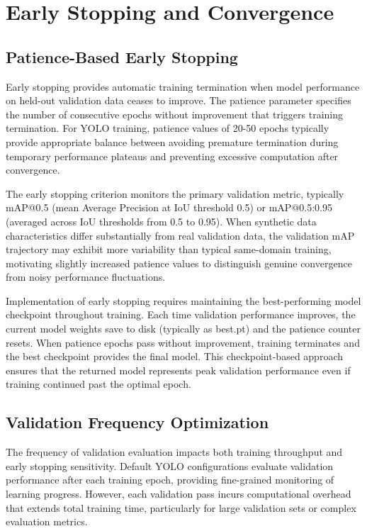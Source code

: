 \section{Early Stopping and Convergence}
\label{sec:early_stopping}

\subsection{Patience-Based Early Stopping}

Early stopping provides automatic training termination when model performance on held-out validation data ceases to improve. The patience parameter specifies the number of consecutive epochs without improvement that triggers training termination. For YOLO training, patience values of 20-50 epochs typically provide appropriate balance between avoiding premature termination during temporary performance plateaus and preventing excessive computation after convergence.

The early stopping criterion monitors the primary validation metric, typically mAP@0.5 (mean Average Precision at IoU threshold 0.5) or mAP@0.5:0.95 (averaged across IoU thresholds from 0.5 to 0.95). When synthetic data characteristics differ substantially from real validation data, the validation mAP trajectory may exhibit more variability than typical same-domain training, motivating slightly increased patience values to distinguish genuine convergence from noisy performance fluctuations.

Implementation of early stopping requires maintaining the best-performing model checkpoint throughout training. Each time validation performance improves, the current model weights save to disk (typically as best.pt) and the patience counter resets. When patience epochs pass without improvement, training terminates and the best checkpoint provides the final model. This checkpoint-based approach ensures that the returned model represents peak validation performance even if training continued past the optimal epoch.

\subsection{Validation Frequency Optimization}

The frequency of validation evaluation impacts both training throughput and early stopping sensitivity. Default YOLO configurations evaluate validation performance after each training epoch, providing fine-grained monitoring of learning progress. However, each validation pass incurs computational overhead that extends total training time, particularly for large validation sets or complex evaluation metrics.

